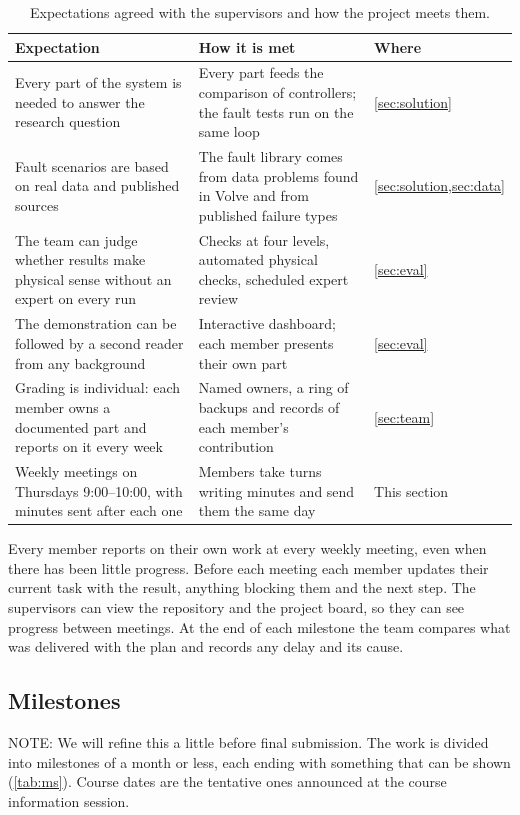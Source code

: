 \documentclass[11pt,letterpaper]{article}
\begin{document}
\begin{table}[!htbp]
\caption{Expectations agreed with the supervisors and how the project meets them.}\label{tab:expect}
\small
\begin{tabularx}{\textwidth}{@{}P{5.6cm}LP{2.2cm}@{}}
\toprule
\textbf{Expectation} & \textbf{How it is met} & \textbf{Where} \\
\midrule
Every part of the system is needed to answer the research question & Every part feeds the comparison of controllers; the fault tests run on the same loop & \cref{sec:solution} \\
Fault scenarios are based on real data and published sources & The fault library comes from data problems found in Volve and from published failure types & \cref{sec:solution,sec:data} \\
The team can judge whether results make physical sense without an expert on every run & Checks at four levels, automated physical checks, scheduled expert review & \cref{sec:eval} \\
The demonstration can be followed by a second reader from any background & Interactive dashboard; each member presents their own part & \cref{sec:eval} \\
Grading is individual: each member owns a documented part and reports on it every week & Named owners, a ring of backups and records of each member's contribution & \cref{sec:team} \\
Weekly meetings on Thursdays 9:00--10:00, with minutes sent after each one & Members take turns writing minutes and send them the same day & This section \\
\bottomrule
\end{tabularx}
\end{table}

Every member reports on their own work at every weekly meeting, even when there has been
little progress. Before each meeting each member updates their current task with the
result, anything blocking them and the next step. The supervisors can view the repository
and the project board, so they can see progress between meetings. At the end of each
milestone the team compares what was delivered with the plan and records any delay and
its cause.

\subsection{Milestones}
NOTE: We will refine this a little before final submission.
The work is divided into milestones of a month or less, each ending with something that
can be shown (\cref{tab:ms}). Course dates are the tentative ones announced at the course
information session.
\end{document}
